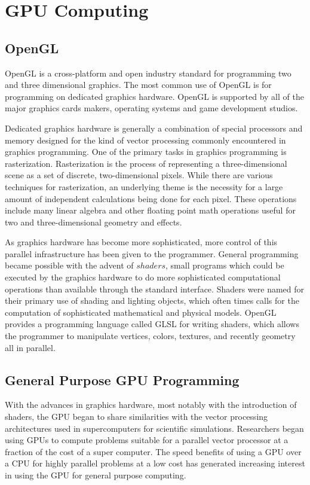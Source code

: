 \chapter{GPU Computing}

\section{OpenGL}
OpenGL is a cross-platform and open industry standard for programming two and
three dimensional graphics.\cite{OpenGL} The most common use of OpenGL is for programming on
dedicated graphics hardware. OpenGL is supported by all of the major graphics
cards makers, operating systems and game development studios.


Dedicated graphics hardware is generally a combination of special processors
and memory designed for the kind of vector processing commonly encountered in
graphics programming. One of the primary tasks in graphics programming is
rasterization. Rasterization is the process of representing a three-dimensional
scene as a set of discrete, two-dimensional pixels. While there are various
techniques for rasterization, an underlying theme is the necessity for a large
amount of independent calculations being done for each pixel. These operations
include many linear algebra and other floating point math operations useful for
two and three-dimensional geometry and effects.\cite{Luebke2007}


As graphics hardware has become more sophisticated, more control of this
parallel infrastructure has been given to the programmer. General programming
became possible with the advent of $shaders$, small programs which could be
executed by the graphics hardware to do more sophisticated computational
operations than available through the standard interface. Shaders were named
for their primary use of shading and lighting objects, which often times calls
for the computation of sophisticated mathematical and physical models. OpenGL
provides a programming language called GLSL for writing shaders, which allows
the programmer to manipulate vertices, colors, textures, and recently geometry
all in parallel.\cite{Luebke2007}


\section{General Purpose GPU Programming}


With the advances in graphics hardware, most notably with the introduction of
shaders, the GPU began to share similarities with the vector processing
architectures used in supercomputers for scientific simulations. Researchers
began using GPUs to compute problems suitable for a parallel vector processor
at a fraction of the cost of a super computer. The speed benefits of using a
GPU over a CPU for highly parallel problems at a low cost has generated
increasing interest in using the GPU for general purpose computing.\cite{Owens2007}


